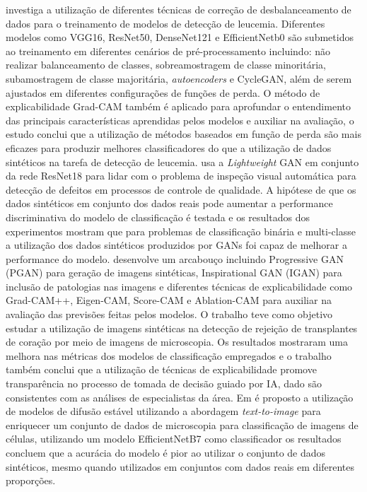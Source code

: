  investiga a utilização de diferentes técnicas de correção de desbalanceamento de dados para o treinamento de modelos de detecção de leucemia. Diferentes modelos como VGG16, ResNet50, DenseNet121 e EfficientNetb0 são submetidos ao treinamento em diferentes cenários de pré-processamento incluindo: não realizar balanceamento de classes, sobreamostragem de classe minoritária, subamostragem de classe majoritária, \textit{autoencoders} e CycleGAN, além de serem ajustados em diferentes configurações de funções de perda. O método de explicabilidade Grad-CAM também é aplicado para aprofundar o entendimento das principais características aprendidas pelos modelos e auxiliar na avaliação, o estudo conclui que a utilização de métodos baseados em função de perda são mais eficazes para produzir melhores classificadores do que a utilização de dados sintéticos na tarefa de detecção de leucemia.
 usa a \textit{Lightweight} GAN em conjunto da rede ResNet18 para lidar com o problema de inspeção visual automática para detecção de defeitos em processos de controle de qualidade. A hipótese de que os dados sintéticos em conjunto dos dados reais pode aumentar a performance discriminativa do modelo de classificação é testada e os resultados dos experimentos mostram que para problemas de classificação binária e multi-classe a utilização dos dados sintéticos produzidos por GANs foi capaz de melhorar a performance do modelo.
 desenvolve um arcabouço incluindo Progressive GAN (PGAN) para geração de imagens sintéticas, Inspirational GAN (IGAN) para inclusão de patologias nas imagens e diferentes técnicas de explicabilidade como Grad-CAM++, Eigen-CAM, Score-CAM e Ablation-CAM para auxiliar na avaliação das previsões feitas pelos modelos. O trabalho teve como objetivo estudar a utilização de imagens sintéticas na detecção de rejeição de transplantes de coração por meio de imagens de microscopia. Os resultados mostraram uma melhora nas métricas dos modelos de classificação empregados e o trabalho também conclui que a utilização de técnicas de explicabilidade promove transparência no processo de tomada de decisão guiado por IA, dado são consistentes com as análises de especialistas da área.
Em  é proposto a utilização de modelos de difusão estável utilizando a abordagem \textit{text-to-image} para enriquecer um conjunto de dados de microscopia para classificação de imagens de células, utilizando um modelo EfficientNetB7 como classificador os resultados concluem que a acurácia do modelo é pior ao utilizar o conjunto de dados sintéticos, mesmo quando utilizados em conjuntos com dados reais em diferentes proporções.
